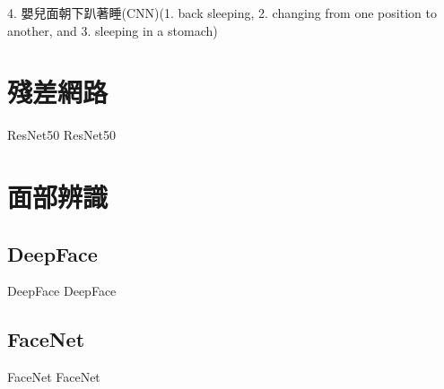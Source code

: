 \documentclass[class=NCU_thesis, crop=false]{standalone}
\begin{document}
4. 嬰兒面朝下趴著睡(CNN)(1. back sleeping, 2. changing from one position to another, and 3. sleeping in a stomach)




\section{殘差網路}
ResNet50 ResNet50

\section{面部辨識}
\subsection{DeepFace}
DeepFace DeepFace

\subsection{FaceNet}
FaceNet FaceNet
\end{document}
